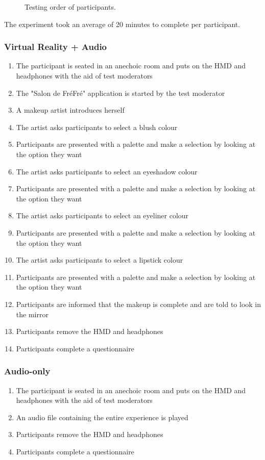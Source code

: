 \documentclass{sigchi}
\begin{document}
\begin{figure}[htb]
\centering
{}
\caption{Testing order of participants.}
\label{fig:testing_order}
\end{figure}

The experiment took an average of 20 minutes to complete per participant.

\subsubsection{Virtual Reality + Audio}
\begin{enumerate}
\item{The participant is seated in an anechoic room and puts on the HMD and headphones with the aid of test moderators}
\item{The "Salon de Fr\'{e}Fr\'{e}" application is started by the test moderator}
\item{A makeup artist introduces herself}
\item{The artist asks participants to select a blush colour}
\item{Participants are presented with a palette and make a selection by looking at the option they want}
\item{The artist asks participants to select an eyeshadow colour}
\item{Participants are presented with a palette and make a selection by looking at the option they want}
\item{The artist asks participants to select an eyeliner colour}
\item{Participants are presented with a palette and make a selection by looking at the option they want}
\item{The artist asks participants to select a lipstick colour}
\item{Participants are presented with a palette and make a selection by looking at the option they want}
\item{Participants are informed that the makeup is complete and are told to look in the mirror}
\item{Participants remove the HMD and headphones}
\item{Participants complete a questionnaire}
\end{enumerate}

\subsubsection{Audio-only}
\begin{enumerate}
\item{The participant is seated in an anechoic room and puts on the HMD and headphones with the aid of test moderators}
\item{An audio file containing the entire experience is played}
\item{Participants remove the HMD and headphones}
\item{Participants complete a questionnaire}
\end{enumerate}
\end{document}
